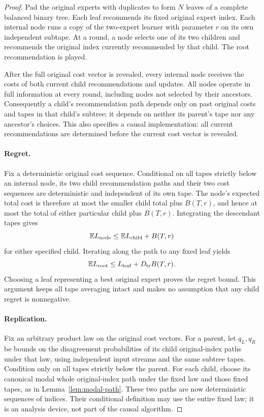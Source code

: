 \begin{proof}
Pad the original experts with duplicates to form $N$ leaves of a complete
balanced binary tree. Each leaf recommends its fixed original expert
index. Each internal node runs a copy of the two-expert learner with
parameter $r$ on its own independent subtape. At a round, a node selects
one of its two children and recommends the original index currently
recommended by that child. The root recommendation is played.

After the full original cost vector is revealed, every internal node
receives the costs of both current child recommendations and updates.
All nodes operate in full information at every round, including nodes
not selected by their ancestors. Consequently a child's recommendation
path depends only on past original costs and tapes in that child's
subtree; it depends on neither its parent's tape nor any ancestor's
choices. This also specifies a causal implementation: all current
recommendations are determined before the current cost vector is
revealed.

\paragraph{Regret.}
Fix a deterministic original cost sequence. Conditional on all tapes
strictly below an internal node, its two child recommendation paths and
their two cost sequences are deterministic and independent of its own
tape. The node's expected total cost is therefore at most the smaller
child total plus $B(T,r)$, and hence at most the total of either
particular child plus $B(T,r)$. Integrating the descendant tapes gives
\[
 \mathbb E L_{\rm node}\le\mathbb E L_{\rm child}+B(T,r)
\]
for either specified child. Iterating along the path to any fixed leaf
yields
\[
 \mathbb E L_{\rm root}\le L_{\rm leaf}+D_{\rm tr}B(T,r).
\]
Choosing a leaf representing a best original expert proves the regret
bound. This argument keeps all tape averaging intact and makes no
assumption that any child regret is nonnegative.

\paragraph{Replication.}
Fix an arbitrary product law on the original cost vectors. For a parent,
let $q_L,q_R$ be bounds on the disagreement probabilities of its child
original-index paths under that law, using independent input streams
and the same subtree tapes. Condition only on all tapes strictly below
the parent. For each child, choose its canonical modal whole
original-index path under the fixed law and those fixed tapes, as in
Lemma~\ref{lem:modal-path}. These two paths are now deterministic
sequences of indices. Their conditional definition may use the entire
fixed law; it is an analysis device, not part of the causal algorithm.


\end{proof}
